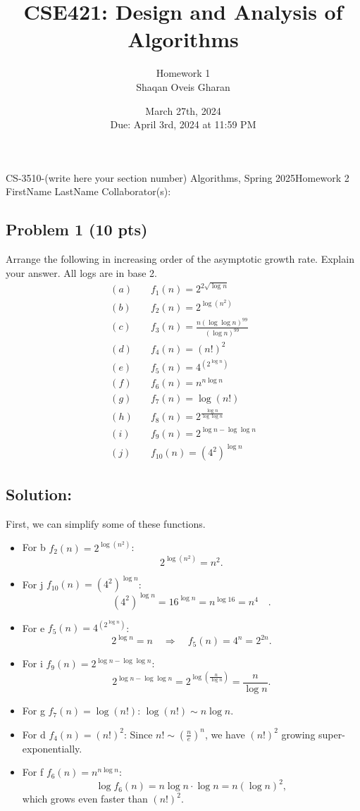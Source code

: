 \documentclass[12pt]{article}
\title{\textbf{CSE421: Design and Analysis of Algorithms}}
\author{Homework 1 \\ Shaqan Oveis Gharan}
\date{March 27th, 2024 \\ Due: April 3rd, 2024 at 11:59 PM}
\begin{document}
\noindent CS-3510-(write here your section number) Algorithms, Spring 2025\hfill Homework 2\\
FirstName LastName \hfill Collaborator(s):

\hrulefill

\subsection*{Problem 1 (10 pts)}
Arrange the following in increasing order of the asymptotic growth rate. Explain your answer. All logs are in base 2.
\begin{align*}
    (a) \quad & f_1(n) = 2^{2\sqrt{\log n}} \\
    (b) \quad & f_2(n) = 2^{\log(n^2)} \\
    (c) \quad & f_3(n) = \frac{n (\log \log n)^{99}}{(\log n)^{99}} \\
    (d) \quad & f_4(n) = (n!)^2\\
    (e) \quad & f_5(n) = 4^{(2^{\log n})} \\
    (f) \quad & f_6(n) = n^{n \log n} \\
    (g) \quad & f_7(n) = \log(n!) \\
    (h) \quad & f_8(n) = 2^{\frac{\log n}{\log \log n}} \\
    (i) \quad & f_9(n) = 2^{\log n - \log \log n} \\
    (j) \quad & f_{10}(n) = (4^2)^{\log n}
\end{align*}

\subsection*{Solution:}
First, we can simplify some of these functions.

\begin{itemize}
    \item For b \(f_2(n)=2^{\log (n^2)}\):  
    \[
    2^{\log (n^2)} = n^2.
    \]
    \item For j \(f_{10}(n)=(4^2)^{\log n}\):  
    \[
    (4^2)^{\log n} = 16^{\log n} = n^{\log 16} = n^4 \quad.
    \]
    \item For e \(f_5(n)=4^{(2^{\log n})}\):  
    \[
    2^{\log n} = n \quad \Longrightarrow \quad f_5(n)=4^n = 2^{2n}.
    \]
    \item For i \(f_9(n)=2^{\log n-\log \log n}\):  
    \[
    2^{\log n-\log \log n} = 2^{\log\left(\frac{n}{\log n}\right)} = \frac{n}{\log n}.
    \]
    \item For g \(f_7(n)=\log(n!)\):  \(\log(n!) \sim n\log n\).
    \item For d \(f_4(n)=(n!)^2\):  
    Since \(n! \sim \left(\frac{n}{e}\right)^n\), we have \((n!)^2\) growing super-exponentially.
    \item For f \(f_6(n)=n^{n \log n}\):
    \[
    \log f_6(n) = n \log n \cdot \log n = n(\log n)^2,
    \]
    which grows even faster than \((n!)^2\).
\end{itemize}
\end{document}
